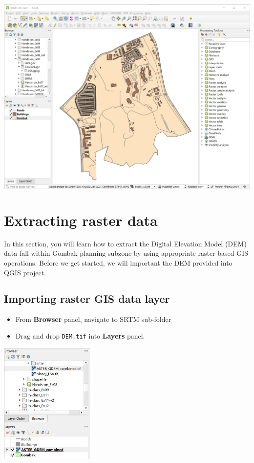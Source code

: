 \documentclass[
  letterpaper,
  DIV=11,
  numbers=noendperiod]{scrreprt}
\providecommand{\tightlist}{%
  \setlength{\itemsep}{0pt}\setlength{\parskip}{0pt}}\usepackage{longtable,booktabs,array}
\begin{document}
\includegraphics{./img07/image17.jpg}

\hypertarget{extracting-raster-data}{%
\section{Extracting raster data}\label{extracting-raster-data}}

In this section, you will learn how to extract the Digital Elevation
Model (DEM) data fall within Gombak planning subzone by using
appropriate raster-based GIS operations. Before we get started, we will
important the DEM provided into QGIS project.

\hypertarget{importing-raster-gis-data-layer}{%
\subsection{Importing raster GIS data
layer}\label{importing-raster-gis-data-layer}}

\begin{itemize}
\tightlist
\item
  From \textbf{Browser} panel, navigate to SRTM sub-folder
\item
  Drag and drop \texttt{DEM.tif} into \textbf{Layers} panel.
\end{itemize}

\includegraphics[width=0.35\textwidth,height=\textheight]{./img07/image18.jpg}
\end{document}
